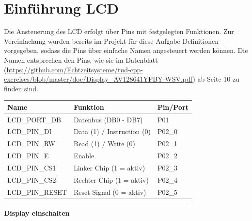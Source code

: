 


\section*{Einführung LCD}
Die Ansteuerung des LCD erfolgt über Pins mit festgelegten Funktionen.
Zur Vereinfachung wurden bereits im Projekt für diese Aufgabe Definitionen vorgegeben, sodass die Pins über einfache Namen angesteuert werden können. Die Namen entsprechen den Pins, wie sie im Datenblatt (\url{https://github.com/Echtzeitsysteme/tud-cpp-exercises/blob/master/doc/Display_AV128641YFBY-WSV.pdf}) ab Seite 10 zu finden sind.

\begin{center}
	\begin{tabular}{l|l|l}
		\toprule
		\textbf{Name} & \textbf{Funktion} & \textbf{Pin/Port} \\ 
		\midrule
		LCD\_PORT\_DB & Datenbus (DB0 - DB7) & P01 \\ 
		LCD\_PIN\_DI & Data (1) / Instruction (0) & P02\_0 \\ 
		LCD\_PIN\_RW & Read (1) / Write (0) & P02\_1 \\ 
		LCD\_PIN\_E & Enable & P02\_2 \\ 
		LCD\_PIN\_CS1 & Linker Chip (1 = aktiv) & P02\_3 \\ 
		LCD\_PIN\_CS2 & Rechter Chip (1 = aktiv) & P02\_4 \\ 
		LCD\_PIN\_RESET & Reset-Signal (0 = aktiv) & P02\_5 \\ 
		\bottomrule
	\end{tabular}
\end{center}

\paragraph{Display einschalten}

